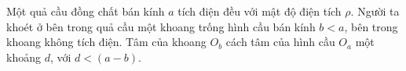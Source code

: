     \begin{vd}
    \begin{minipage}{0.5\textwidth}
      Một quả cầu đồng chất bán kính $a$ tích điện đều với mật độ điện tích $\rho$. Người ta khoét ở bên trong quả cầu một khoang trống hình cầu bán kính $b<a$, bên trong khoang không tích điện. Tâm của khoang $O_b$ cách tâm của hình cầu $O_a$ một khoảng $d$, với $d<(a-b)$.
    \end{minipage}
    \begin{minipage}{0.5\textwidth}
      \centering
{} %

\begin{tikzpicture}[x=0.75pt,y=0.75pt,yscale=-1,xscale=1]


\end{tikzpicture}
\end{minipage}
\end{vd}
